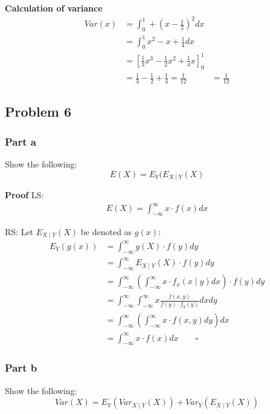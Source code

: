 \textbf{Calculation of variance}
\begin{align*}
Var(x)	&=\int_{0}^{1}+(x-\frac{1}{2})^2 dx\\
		&=\int_{0}^{1}x^{2}-x+\frac{1}{4}dx\\
		&=\left[\frac{1}{3}x^{3}-\frac{1}{2}x^{2}+\frac{1}{4}x\right]_{0}^{1}\\
		&=\frac{1}{3}-\frac{1}{2}+\frac{1}{4}=\frac{1}{12}
		&=\frac{1}{12}
\end{align*}

\subsection*{Problem 6}
\subsubsection*{Part a}
Show the following:
\begin{equation}
E(X)=E_{Y}(E_{X\mid Y}(X)
\end{equation}

\textbf{Proof}\linebreak
LS:
\begin{align*}
E(X)=\int_{-\infty}^{\infty}x\cdot f(x)dx
\end{align*}

RS: Let $E_{X\mid Y}(X)$ be denoted as $g(x)$:
\begin{align*}
E_{Y}(g(x))	&=\int_{-\infty}^{\infty}g(X)\cdot f(y)dy	\\
			&=\int_{-\infty}^{\infty}E_{X\mid Y}(X)\cdot f(y)dy	\\
			&=\int_{-\infty}^{\infty}\left(\int_{-\infty}^{\infty}x\cdot f_{x}(x\mid y)dx\right)\cdot f(y)dy	\\
			&=\int_{-\infty}^{\infty}\int_{-\infty}^{\infty}x\frac{f(x,y)}{f(y)\cdot f_{y}(y)}dxdy\\
			&=\int_{-\infty}^{\infty}\left(\int_{-\infty}^{\infty}x\cdot f(x,y)dy\right)dx\\
			&=\int_{-\infty}^{\infty}x\cdot f(x)dx\qquad\square
\end{align*}

\subsubsection*{Part b}
Show the following:
\begin{equation*}
Var(X)=E_{Y}(Var_{X\mid Y}(X))+Var_{Y}(E_{X\mid Y}(X))
\end{equation*}

